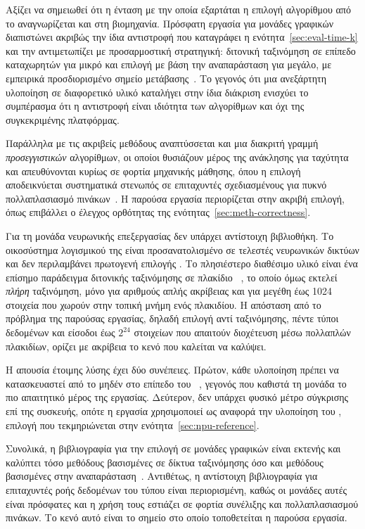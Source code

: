 Αξίζει να σημειωθεί ότι η ένταση με την οποία εξαρτάται η επιλογή αλγορίθμου από
το  αναγνωρίζεται και στη βιομηχανία. Πρόσφατη εργασία για μονάδες γραφικών
 διαπιστώνει ακριβώς την ίδια αντιστροφή που καταγράφει η
ενότητα~\ref{sec:eval-time-k} και την αντιμετωπίζει με προσαρμοστική στρατηγική:
διτονική ταξινόμηση σε επίπεδο καταχωρητών για μικρό  και επιλογή με βάση
την αναπαράσταση για μεγάλο, με εμπειρικά προσδιορισμένο σημείο
μετάβασης~\cite{lin2026adaptivetopk}. Το γεγονός ότι μια ανεξάρτητη υλοποίηση σε
διαφορετικό υλικό καταλήγει στην ίδια διάκριση ενισχύει το συμπέρασμα ότι η
αντιστροφή είναι ιδιότητα των αλγορίθμων και όχι της συγκεκριμένης πλατφόρμας.

Παράλληλα με τις ακριβείς μεθόδους αναπτύσσεται και μια διακριτή γραμμή
\emph{προσεγγιστικών} αλγορίθμων, οι οποίοι θυσιάζουν μέρος της ανάκλησης για
ταχύτητα και απευθύνονται κυρίως σε φορτία μηχανικής μάθησης, όπου η επιλογή
 αποδεικνύεται συστηματικά στενωπός σε επιταχυντές σχεδιασμένους για
πυκνό πολλαπλασιασμό πινάκων~\cite{samaga2026}. Η παρούσα εργασία περιορίζεται
στην ακριβή επιλογή, όπως επιβάλλει ο έλεγχος ορθότητας της
ενότητας~\ref{sec:meth-correctness}.

Για τη μονάδα νευρωνικής επεξεργασίας δεν υπάρχει αντίστοιχη βιβλιοθήκη. Το
οικοσύστημα λογισμικού της είναι προσανατολισμένο σε τελεστές νευρωνικών δικτύων
και δεν περιλαμβάνει πρωτογενή επιλογής . Το πλησιέστερο διαθέσιμο
υλικό είναι ένα επίσημο παράδειγμα διτονικής ταξινόμησης σε πλακίδιο ~\cite{amd2024bitonicaie}, το οποίο όμως εκτελεί \emph{πλήρη} ταξινόμηση,
μόνο για αριθμούς απλής ακρίβειας και για μεγέθη έως 1024 στοιχεία που χωρούν
στην τοπική μνήμη ενός πλακιδίου. Η απόσταση από το πρόβλημα της παρούσας
εργασίας, δηλαδή επιλογή αντί ταξινόμησης, πέντε τύποι δεδομένων και είσοδοι έως
$2^{24}$ στοιχείων που απαιτούν διοχέτευση μέσω πολλαπλών πλακιδίων, ορίζει με
ακρίβεια το κενό που καλείται να καλύψει.

Η απουσία έτοιμης λύσης έχει δύο συνέπειες. Πρώτον, κάθε υλοποίηση πρέπει να
κατασκευαστεί από το μηδέν στο επίπεδο του ~\cite{mliraie}, γεγονός
που καθιστά τη μονάδα το πιο απαιτητικό μέρος της εργασίας. Δεύτερον, δεν υπάρχει
φυσικό μέτρο σύγκρισης επί της συσκευής, οπότε η εργασία χρησιμοποιεί ως αναφορά
την υλοποίηση του , επιλογή που τεκμηριώνεται στην
ενότητα~\ref{sec:npu-reference}.

Συνολικά, η βιβλιογραφία για την επιλογή  σε μονάδες γραφικών είναι
εκτενής και καλύπτει τόσο μεθόδους βασισμένες σε δίκτυα ταξινόμησης όσο και
μεθόδους βασισμένες στην αναπαράσταση~\cite{sismanis2012,lin2026adaptivetopk}.
Αντιθέτως, η αντίστοιχη βιβλιογραφία για επιταχυντές ροής δεδομένων του τύπου
 είναι περιορισμένη, καθώς οι μονάδες αυτές είναι πρόσφατες και η χρήση
τους εστιάζει σε φορτία συνέλιξης και πολλαπλασιασμού πινάκων. Το κενό αυτό είναι
το σημείο στο οποίο τοποθετείται η παρούσα εργασία.
